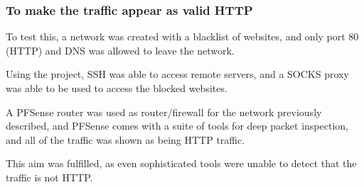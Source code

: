 \subsubsection{To make the traffic appear as valid HTTP}
To test this, a network was created with a blacklist of websites, and only port 80 (HTTP) and DNS was allowed to leave the network.\par
Using the project, SSH was able to access remote servers, and a SOCKS proxy was able to be used to access the blocked websites.\par
A PFSense router was used as router/firewall for the network previously described, and PFSense comes with a suite of tools for deep packet inspection, and all of the traffic was shown as being HTTP traffic.\par
This aim was fulfilled, as even sophisticated tools were unable to detect that the traffic is not HTTP\@.
